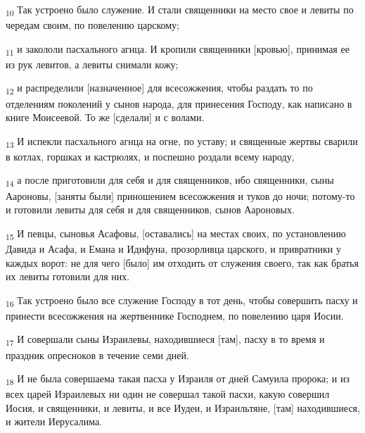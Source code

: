 \begin{tcolorbox}
\textsubscript{10} Так устроено было служение. И стали священники на место свое и левиты по чередам своим, по повелению царскому;
\end{tcolorbox}
\begin{tcolorbox}
\textsubscript{11} и закололи пасхального агнца. И кропили священники [кровью], принимая ее из рук левитов, а левиты снимали кожу;
\end{tcolorbox}
\begin{tcolorbox}
\textsubscript{12} и распределили [назначенное] для всесожжения, чтобы раздать то по отделениям поколений у сынов народа, для принесения Господу, как написано в книге Моисеевой. То же [сделали] и с волами.
\end{tcolorbox}
\begin{tcolorbox}
\textsubscript{13} И испекли пасхального агнца на огне, по уставу; и священные жертвы сварили в котлах, горшках и кастрюлях, и поспешно роздали всему народу,
\end{tcolorbox}
\begin{tcolorbox}
\textsubscript{14} а после приготовили для себя и для священников, ибо священники, сыны Аароновы, [заняты были] приношением всесожжения и туков до ночи; потому-то и готовили левиты для себя и для священников, сынов Аароновых.
\end{tcolorbox}
\begin{tcolorbox}
\textsubscript{15} И певцы, сыновья Асафовы, [оставались] на местах своих, по установлению Давида и Асафа, и Емана и Идифуна, прозорливца царского, и привратники у каждых ворот: не для чего [было] им отходить от служения своего, так как братья их левиты готовили для них.
\end{tcolorbox}
\begin{tcolorbox}
\textsubscript{16} Так устроено было все служение Господу в тот день, чтобы совершить пасху и принести всесожжения на жертвеннике Господнем, по повелению царя Иосии.
\end{tcolorbox}
\begin{tcolorbox}
\textsubscript{17} И совершали сыны Израилевы, находившиеся [там], пасху в то время и праздник опресноков в течение семи дней.
\end{tcolorbox}
\begin{tcolorbox}
\textsubscript{18} И не была совершаема такая пасха у Израиля от дней Самуила пророка; и из всех царей Израилевых ни один не совершал такой пасхи, какую совершил Иосия, и священники, и левиты, и все Иудеи, и Израильтяне, [там] находившиеся, и жители Иерусалима.
\end{tcolorbox}
